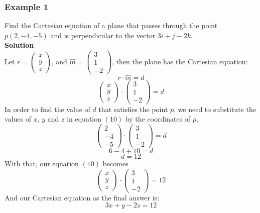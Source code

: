 \documentclass[hidelinks, a4paper, 12pt]{article}
\newcommand{\bd}{\textbf}
\newcommand{\mhat}{\hat{m}}
\newcommand{\n}{\\[\baselineskip]}
\begin{document}
            \subsubsection{Example 1}
                Find the Cartesian equation of a plane that passes through the point $p(2, -4, -5)$ and is perpendicular to the vector $3i + j - 2k$.\n
                \bd{Solution}\\
                Let $r = \begin{pmatrix}x\\y\\z\end{pmatrix}$, and $\mhat = \begin{pmatrix}3\\1\\-2\end{pmatrix}$, then the plane has the Cartesian equation:
                \[r\cdot\mhat = d\]
                \begin{equation}
                    \begin{pmatrix} x\\y\\z \end{pmatrix} \cdot \begin{pmatrix} 3\\1\\-2 \end{pmatrix} = d
                \end{equation}
                In order to find the value of $d$ that satisfies the point $p$, we need to substitute the values of $x$, $y$ and $z$ in equation $(10)$ by the coordinates of $p$,
                \[\begin{pmatrix} 2\\-4\\-5 \end{pmatrix} \cdot \begin{pmatrix} 3\\1\\-2 \end{pmatrix} = d\]
                \[6-4+10 = d\]
                \[d = 12\]
                With that, our equation $(10)$ becomes
                \[\begin{pmatrix} x\\y\\z \end{pmatrix} \cdot \begin{pmatrix} 3\\1\\-2 \end{pmatrix} = 12\]
                And our Cartesian equation as the final answer is:
                \[3x + y - 2z = 12\]
        
\end{document}
